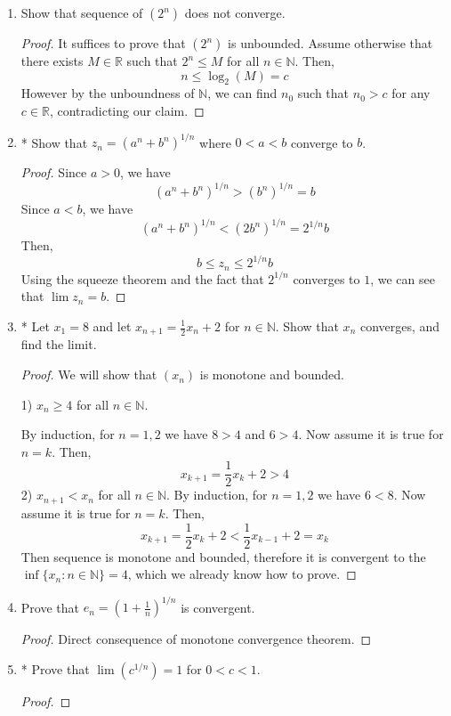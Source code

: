 \begin{enumerate}
    \item Show that sequence of $(2^n)$ does not converge.
    \begin{proof} It suffices to prove that $(2^n)$ is unbounded. Assume otherwise that there exists $M \in \mathbb{R}$ such that $2^n \le M$ for all $n \in \mathbb{N}$. Then,
        \[ n \le \log_{2}(M) = c\]
        However by the unboundness of $\mathbb{N}$, we can find $n_0$ such that $n_0 > c$ for any $c \in \mathbb{R}$, contradicting our claim.
    \end{proof}
    \item* Show that $z_n = (a^n+b^n)^{1/n}$ where $0 < a < b$ converge to $b$.
    \begin{proof}
        Since $a >0$, we have
        \[ (a^n+b^n)^{1/n} > (b^n)^{1/n} = b\]
        Since $a < b$, we have
        \[ (a^n+b^n)^{1/n} < (2b^n)^{1/n} = 2^{1/n}b\]
        Then,
        \[b \le z_n \le 2^{1/n}b\]
        Using the squeeze theorem and the fact that $2^{1/n}$ converges to $1$, we can see that $\lim z_n = b$.
    \end{proof}
\item* Let $x_1 = 8$ and let $x_{n+1} = \frac{1}{2}x_n +2$ for $n \in \mathbb{N}$. Show that $x_n$ converges, and find the limit.
    \begin{proof} We will show that $(x_n)$ is monotone and bounded.

        1) $x_n \ge 4$ for all $n \in \mathbb{N}$.

        By induction, for $n= 1,2$ we have $8 > 4$ and $6 > 4$. Now assume it is true for $n = k$. Then,
        \[x_{k+1} = \frac{1}{2}x_k + 2 > 4\]
        2) $x_{n+1} < x_n$ for all $n \in \mathbb{N}$.
        By induction, for $n = 1,2$ we have $6 < 8$. Now assume it is true for $n = k$. Then,
        \[x_{k+1} = \frac{1}{2}x_k + 2 < \frac{1}{2} x_{k-1} + 2 = x_k\]
        Then sequence is monotone and bounded, therefore it is convergent to the $\inf\{x_n : n \in \mathbb{N}\} = 4$, which we already know how to prove.
    \end{proof}
\item Prove that $e_n = \left( 1 + \frac{1}{n} \right)^{1/n}$ is convergent.
    \begin{proof}
        Direct consequence of monotone convergence theorem.
    \end{proof}
\item* Prove that $\lim(c^{1/n}) = 1$ for $ 0 < c < 1$.
    \begin{proof}


\end{proof}
\end{enumerate}
